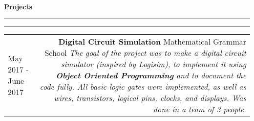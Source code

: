 \documentclass{article}
\newcommand{\mainitem}[3] {
    \textbf{#1}  \newline #2 \vskip5pt  \textit{#3} 
    \vspace{6pt}    %
}
\newenvironment{cvtable} {
	\hspace{-20pt} \begin{tabular}{L!{\color{line_color}\vrule width 1pt}D} %
} 
{\end{tabular}}
\renewcommand{\section}[1] {
    \vspace{15pt}   %
	{\color{main_color} \Large \textbf {#1}}
	{\color{line_color} \vskip-5pt \rule{\linewidth}{0.5mm}\hfill\vskip-11pt\rule{\linewidth}{0.2pt}}
	\vskip10pt  %
}
\begin{document}
    \newpage

    \section{Projects}
    	\begin{cvtable}
    		\hspace{5pt} May 2017 - June 2017 & 
    			\mainitem
    			    {Digital Circuit Simulation}
    			    {Mathematical Grammar School} 
    			    {
                        The goal of the project was to make a digital circuit simulator (inspired by Logisim), to implement it using \textbf{Object Oriented Programming} and to document the code fully. All basic logic gates were implemented, as well as wires, transistors, logical pins, clocks, and displays. Was done in a team of 3 people.
                    }
    	\end{cvtable}
\end{document}

